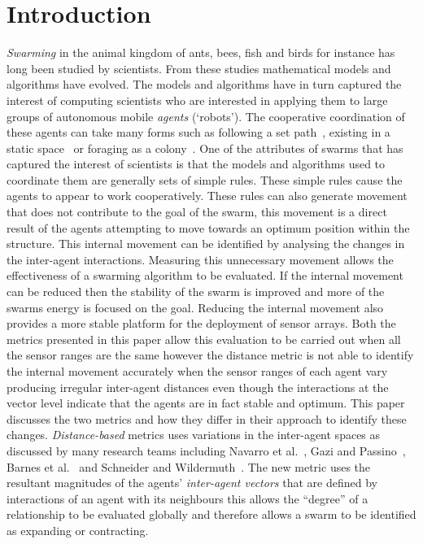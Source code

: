 \documentclass{ieeeaccess}
\begin{document}
\titlepgskip=-15pt
\maketitle


\section{Introduction\label{sec:intro}}

\textit{Swarming} in the animal kingdom of ants, bees, fish and birds for instance has long been studied by scientists. From these studies mathematical models and algorithms have evolved. The models and algorithms have in turn captured the interest of computing scientists who are interested in applying them to large groups of autonomous mobile \textit{agents} (`robots'). The cooperative coordination of these agents can take many forms such as following a set path~\cite{HCS:09}, existing in a static space~\cite{EP:10, GP:02, GP:04} or foraging as a colony~\cite{HER:11, GK:07}. One of the attributes of swarms that has captured the interest of scientists is that the models and algorithms used to coordinate them are generally sets of simple rules. These simple rules cause the agents to appear to work cooperatively. These rules can also generate movement that does not contribute to the goal of the swarm, this movement is a direct result of the agents attempting to move towards an optimum position within the structure. This internal movement can be identified by analysing the changes in the inter-agent interactions. Measuring this unnecessary movement allows the effectiveness of a swarming algorithm to be evaluated. If the internal movement can be reduced then the stability of the swarm is improved and more of the swarms energy is focused on the goal. Reducing the internal movement also provides a more stable platform for the deployment of sensor arrays. Both the metrics presented in this paper allow this evaluation to be carried out when all the sensor ranges are the same however the distance metric is not able to identify the internal movement accurately when the sensor ranges of each agent vary producing irregular inter-agent distances even though the interactions at the vector level indicate that the agents are in fact stable and optimum. This paper discusses the two metrics and how they differ in their approach to identify these changes. \textit{Distance-based} metrics uses variations in the inter-agent spaces as discussed by many research teams including Navarro et al.~\cite{NIM:09}, Gazi and Passino~\cite{GP:02,GP:04}, Barnes et al.~\cite{BAF:06} and Schneider and Wildermuth~\cite{SW:03}. The new metric uses the resultant magnitudes of the agents' \textit{inter-agent vectors} that are defined by interactions of an agent with its neighbours this allows the ``degree'' of a relationship to be evaluated globally and therefore allows a swarm to be identified as expanding or contracting. 
\end{document}
